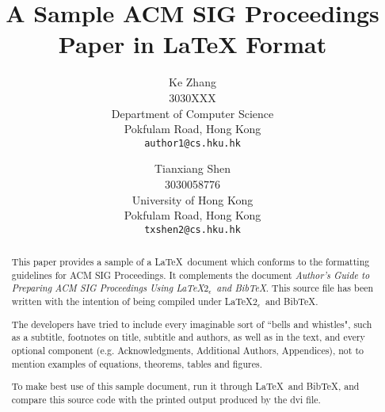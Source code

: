 \documentclass{acm_proc_article-csis8101}
\begin{document}
%

\title{A Sample {\ttlit ACM} SIG Proceedings Paper in LaTeX
Format}
%

\author{
Ke Zhang\\
3030XXX\\
Department of Computer Science\\
Pokfulam Road, Hong Kong\\
\texttt{author1@cs.hku.hk}
\and Tianxiang Shen\\
3030058776\\
University of Hong Kong \\
Pokfulam Road, Hong Kong \\
\texttt{txshen2@cs.hku.hk}
}

%
\maketitle
\begin{abstract}
This paper provides a sample of a \LaTeX\ document which conforms to
the formatting guidelines for ACM SIG Proceedings.
It complements the document \textit{Author's Guide to Preparing
ACM SIG Proceedings Using \LaTeX$2_\epsilon$\ and Bib\TeX}. This
source file has been written with the intention of being
compiled under \LaTeX$2_\epsilon$\ and BibTeX.

The developers have tried to include every imaginable sort
of ``bells and whistles", such as a subtitle, footnotes on
title, subtitle and authors, as well as in the text, and
every optional component (e.g. Acknowledgments, Additional
Authors, Appendices), not to mention examples of
equations, theorems, tables and figures.

To make best use of this sample document, run it through \LaTeX\
and BibTeX, and compare this source code with the printed
output produced by the dvi file.
\end{abstract}
\end{document}
